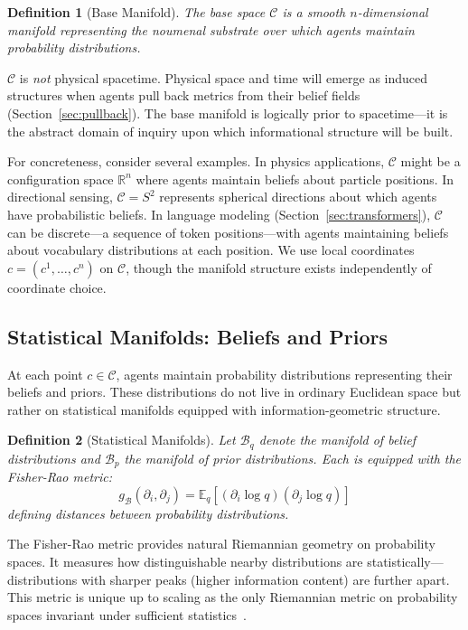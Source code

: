 \documentclass[11pt]{article}
\newtheorem{definition}{Definition}
\begin{document}
\begin{definition}[Base Manifold]
The base space $\mathcal{C}$ is a smooth $n$-dimensional manifold representing the noumenal substrate over which agents maintain probability distributions.
\end{definition}

$\mathcal{C}$ is \emph{not} physical spacetime. Physical space and time will emerge as induced structures when agents pull back metrics from their belief fields (Section~\ref{sec:pullback}). The base manifold is logically prior to spacetime---it is the abstract domain of inquiry upon which informational structure will be built.

For concreteness, consider several examples. In physics applications, $\mathcal{C}$ might be a configuration space $\mathbb{R}^n$ where agents maintain beliefs about particle positions. In directional sensing, $\mathcal{C} = S^2$ represents spherical directions about which agents have probabilistic beliefs. In language modeling (Section~\ref{sec:transformers}), $\mathcal{C}$ can be discrete---a sequence of token positions---with agents maintaining beliefs about vocabulary distributions at each position. We use local coordinates $c = (c^1, \ldots, c^n)$ on $\mathcal{C}$, though the manifold structure exists independently of coordinate choice.

\subsection{Statistical Manifolds: Beliefs and Priors}

At each point $c \in \mathcal{C}$, agents maintain probability distributions representing their beliefs and priors. These distributions do not live in ordinary Euclidean space but rather on statistical manifolds equipped with information-geometric structure.

\begin{definition}[Statistical Manifolds]
Let $\mathcal{B}_q$ denote the manifold of belief distributions and $\mathcal{B}_p$ the manifold of prior distributions. Each is equipped with the Fisher-Rao metric:
\begin{equation}
g_{\mathcal{B}}(\partial_i, \partial_j) = \mathbb{E}_{q}\left[(\partial_i \log q)(\partial_j \log q)\right]
\end{equation}
defining distances between probability distributions.
\end{definition}

The Fisher-Rao metric provides natural Riemannian geometry on probability spaces. It measures how distinguishable nearby distributions are statistically---distributions with sharper peaks (higher information content) are further apart. This metric is unique up to scaling as the only Riemannian metric on probability spaces invariant under sufficient statistics~\cite{Cencov1982}.
\end{document}
